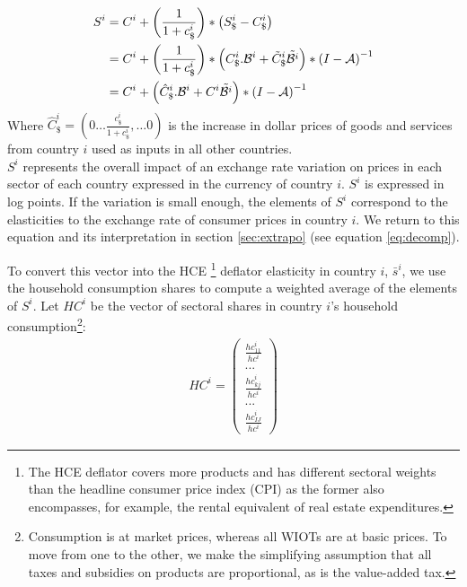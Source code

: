 \documentclass[11pt,a4paper]{paper} %
\begin{document}
\begin{equation}
\begin{aligned}
	S^i&=C^i  + \left( \frac{1}{1+{{c}_\$^i}}\right)*\left({S_\$^i}-{{C}_{\$}^i}\right)\\
	&=C^i + \left( \frac{1}{1+{{c}_\$^i}}\right)*\left(C_\$^i.{\cal B}^i+{\tilde{C}_\$^i}{\tilde{{\cal B}^i}}\right)*{{(I-{\cal A})}^{-1}} 	\\
	&=C^i	+ \left(\hat{C}^i_\$.{\cal B}^i+{C^i}{\tilde{{\cal B}^i}}\right)*{{(I-{\cal A})}^{-1}}	
\label{eq:eqdomcurrency}
\end{aligned}
\end{equation}
Where $\hat{C}^i_\$=\left(0 \ldots \frac{c_\$^i}{1+c_\$^i},\ldots 0 \right)$ is the increase in dollar prices of goods and services from country $i$ used as inputs in all other countries.\\ 
$S^i$ represents the overall impact of an exchange rate variation on prices in each sector of each country expressed in the currency of country $i$. $S^i$ is expressed in log points. If the variation is small enough, the elements of $S^i$ correspond to the elasticities to the exchange rate of consumer prices in country $i$.
We return to this equation and its interpretation in section \ref{sec:extrapo} (see equation \ref{eq:decomp}).

To convert this vector into the HCE \footnote{The HCE deflator covers more products and has different sectoral weights than the headline consumer price index (CPI) as the former also encompasses, for example, the rental equivalent of real estate expenditures.}
 deflator elasticity in country $i$, $\bar{s}^i$, we use the household consumption shares to compute a weighted average of the elements of $S^i$. Let $HC^i$ be the vector of sectoral shares in country $i$'s household consumption\footnote{Consumption is at market prices, whereas all WIOTs are at basic prices. To move from one to the other, we make the simplifying assumption that all taxes and subsidies on products are proportional, as is the value-added tax.}:
\begin{eqnarray*}
HC^i=\left( 
	\begin{array}{c}
	\frac{{hc}_{11}^i}{hc^i} \\
	...\\
	\frac{{hc}_{kj}^i}{hc^i}\\
	...\\
	\frac{{hc}_{IJ}^i}{hc^i}
	 \end{array}
	 \right)
\end{eqnarray*}
\end{document}
